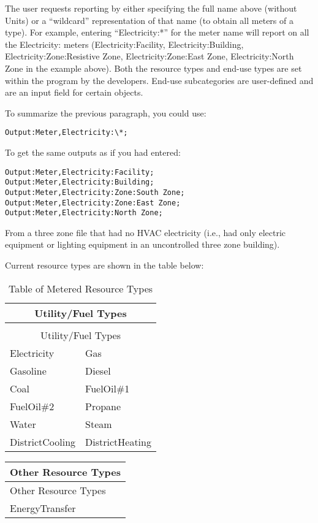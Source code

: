 The user requests reporting by either specifying the full name above (without Units) or a “wildcard” representation of that name (to obtain all meters of a type). For example, entering “Electricity:*” for the meter name will report on all the Electricity: meters (Electricity:Facility, Electricity:Building, Electricity:Zone:Resistive Zone, Electricity:Zone:East Zone, Electricity:North Zone in the example above). Both the resource types and end-use types are set within the program by the developers. End-use subcategories are user-defined and are an input field for certain objects.

To summarize the previous paragraph, you could use:

\begin{lstlisting}
Output:Meter,Electricity:\*;
\end{lstlisting}

To get the same outputs as if you had entered:

\begin{lstlisting}
Output:Meter,Electricity:Facility;
Output:Meter,Electricity:Building;
Output:Meter,Electricity:Zone:South Zone;
Output:Meter,Electricity:Zone:East Zone;
Output:Meter,Electricity:North Zone;
\end{lstlisting}

From a three zone file that had no HVAC electricity (i.e., had only electric equipment or lighting equipment in an uncontrolled three zone building).

Current resource types are shown in the table below:

\begin{longtable}[c]{@{}ll@{}}
\caption{Table of Metered Resource Types \label{table:table-of-metered-resource-types}} \tabularnewline
\toprule 
\multicolumn{2}{c}{Utility/Fuel Types} \tabularnewline
\midrule
\endfirsthead

\caption[]{Table of Metered Resource Types} \tabularnewline
\toprule 
\multicolumn{2}{c}{Utility/Fuel Types} \tabularnewline
\midrule
\endhead

Electricity & Gas \tabularnewline
Gasoline & Diesel \tabularnewline
Coal & FuelOil\#1 \tabularnewline
FuelOil\#2 & Propane \tabularnewline
Water & Steam \tabularnewline
DistrictCooling & DistrictHeating \tabularnewline
\bottomrule
\end{longtable}

\begin{longtable}[c]{@{}l@{}}
\toprule 
Other Resource Types \tabularnewline
\midrule
\endfirsthead

\toprule 
Other Resource Types \tabularnewline
\midrule
\endhead

EnergyTransfer \tabularnewline
\bottomrule
\end{longtable}

